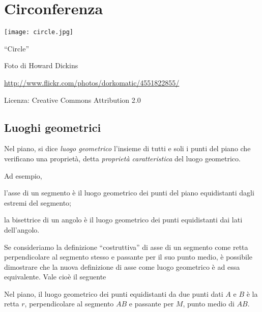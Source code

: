 
\chapter{Circonferenza}\label{chap:circonferenza}

\texttt{[image: circle.jpg]}
  \begin{center}
    {\large ``Circle''}\par
    Foto di Howard Dickins\par
    \url{http://www.flickr.com/photos/dorkomatic/4551822855/}\par
    Licenza: Creative Commons Attribution 2.0\par
  \end{center}
\newpage

\section{Luoghi geometrici}\label{sect:luoghi_geometrici}

\begin{definizione}
Nel piano, si dice \emph{luogo geometrico} l'insieme di tutti e soli i punti del piano che verificano una proprietà, detta \emph{proprietà caratteristica} del luogo geometrico.
\end{definizione}
Ad esempio,
\begin{itemize*}
\item l'asse di un segmento è il luogo geometrico dei punti del piano equidistanti dagli estremi del segmento;
\item la bisettrice di un angolo è il luogo geometrico dei punti equidistanti dai lati dell'angolo.
\end{itemize*}
Se consideriamo la definizione ``costruttiva'' di asse di un segmento come retta perpendicolare al segmento stesso e passante per il suo punto medio, è possibile dimostrare che la nuova definizione di asse come luogo geometrico è ad essa equivalente.
Vale cioè il seguente
\begin{teorema}
Nel piano, il luogo geometrico dei punti equidistanti da due punti dati $A$ e $B$ è la retta $r$, perpendicolare al segmento $AB$ e passante per $M$, punto medio di $AB$.
\end{teorema}

